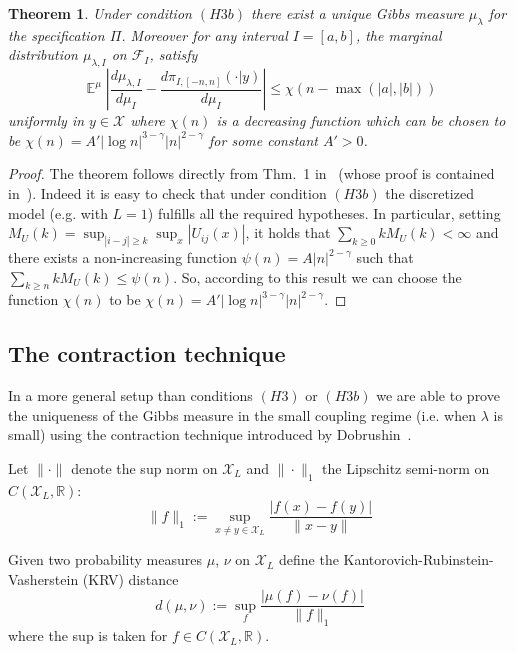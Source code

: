 \documentclass[a4paper,12pt,reqno]{amsart}
\newtheorem{theorem}{Theorem}
\DeclareMathOperator{\expect}{{\mathbb E}}
\newcommand{\R}{\mathbb{R}}
\newcommand{\X}{\mathcal{X}}
\newcommand{\F}{\mathcal{F}}
\begin{document}
\begin{theorem}
\label{th:dobr2}
Under condition $(H3b)$ there exist a unique Gibbs measure $\mu_\lambda$ for the
specification $\Pi$. Moreover for any interval $I=[a,b]$, the marginal distribution
$\mu_{\lambda,I}$ on $\F_I$, satisfy
\begin{equation}
  \label{eq:corr-bounds-xx}
\expect^\mu \left|\frac{d\mu_{\lambda,I}}{d\mu_I} - \frac{d\pi_{I,[-n,n]}(\cdot|y)}{d\mu_I}
\right| \le  \chi(n-\max(|a|,|b|))
\end{equation}
uniformly in $y \in \X$
where $\chi(n)$ is a decreasing function which can be chosen to be
$\chi(n) = A' |\log n|^{3-\gamma} |n|^{2-\gamma}$ for some constant $A'>0$.
\end{theorem}
\begin{proof}
The theorem follows directly from Thm.~1 in~\cite{dobr-uni} (whose proof is contained in~\cite{dobr3}). Indeed
it is easy to check that under condition $(H3b)$  
 the discretized model (e.g. with $L=1$) fulfills all the
required hypotheses.
In particular, setting $M_U(k) = \sup_{|i-j| \ge k} \sup_x
|U_{ij}(x)|$,  it holds that
$
\sum_{k \ge 0} k M_U(k) < \infty  
$
and  there exists a non-increasing function $\psi(n) = A
|n|^{2-\gamma}$ such that
$
\sum_{k \ge n} k M_U(k)\le \psi(n) 
$.  So, according to this result we can choose the function $\chi(n)$
to be $\chi(n) = A' |\log n|^{3-\gamma} |n|^{2-\gamma}$.
\end{proof}

\subsection{The contraction technique}
In a more general setup than conditions $(H3)$ or $(H3b)$ we are able to prove
 the uniqueness of the Gibbs measure in the small coupling regime
(i.e. when $\lambda$ is small) using the contraction technique
introduced by Dobrushin~\cite{Dobr1,Dobr2}.   

Let $\|\cdot\|$ denote the sup norm on $\X_L$ and $\|\cdot\|_1$ the
Lipschitz semi-norm on $C(\X_L,\R)$: 
\begin{equation}
 \|f\|_1 := \sup_{x\neq y \in \X_L} \frac{|f(x)-f(y)|}{\|x-y\|} 
\end{equation}

Given two probability
measures $\mu$, $\nu$ on $\X_L$ define the
Kantorovich-Rubinstein-Vasherstein (KRV) distance
$$
d(\mu,\nu) := \sup_{f} \frac{|\mu(f)-\nu(f)|}{\|f\|_1}
$$
where the sup is taken for $f \in C(\X_L,\R)$.
\end{document}
